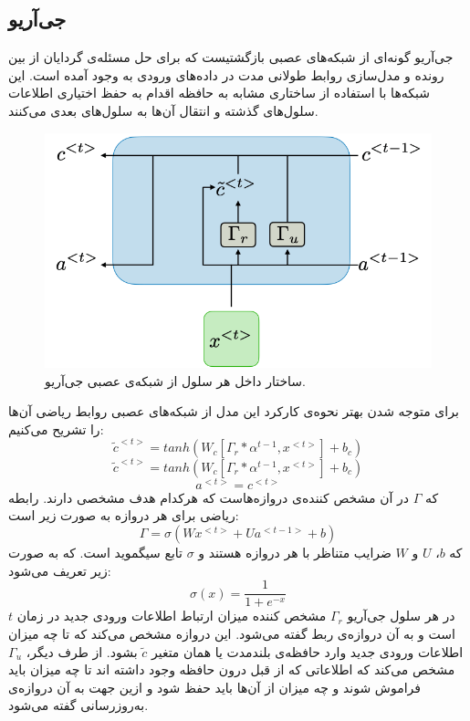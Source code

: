 \subsection{جی‌آریو}
جی‌آریو گونه‌ای از شبکه‌های عصبی بازگشتیست که برای حل مسئله‌ی گردایان از بین رونده و مدل‌سازی روابط طولانی مدت در داده‌های ورودی به وجود آمده است. این شبکه‌ها با استفاده از ساختاری مشابه به حافظه اقدام به حفظ اختیاری اطلاعات سلول‌های گذشته و انتقال آن‌ها به سلول‌های بعدی می‌کنند.\\
\begin{figure}[!t]
	\includegraphics[width=0.8 \textwidth]{images/gru_1}
	\centering
	\caption{ساختار داخل هر سلول از شبکه‌ی عصبی جی‌آریو.}
	\label{fig.gru_1}
\end{figure}
برای متوجه شدن بهتر نحوه‌ی کارکرد این مدل از شبکه‌های عصبی روابط ریاضی آن‌ها را تشریح می‌کنیم:
\begin{equation}
	\tilde{c}^{<t>} = tanh(W_c[\Gamma_r * \alpha^{t-1} , x^{<t>}] + b_c)
\end{equation}
\vspace{-4em}
\begin{equation}
	\tilde{c}^{<t>} = tanh(W_c[\Gamma_r * \alpha^{t-1} , x^{<t>}] + b_c)
\end{equation}
\vspace{-4em}
\begin{equation}
	a^{<t>} = c^{<t>}
\end{equation}
که $\Gamma$ در آن مشخص کننده‌ی دروازه‌هاست که هرکدام هدف مشخصی دارند. رابطه ریاضی برای هر دروازه به صورت زیر است:
\begin{equation}
	\Gamma = \sigma(Wx^{<t>} +Ua^{<t-1>} + b)
\end{equation}
که $b$، $U$ و $W$ ضرایب متناظر با هر دروازه هستند و $\sigma$ تابع سیگموید است. که به صورت زیر تعریف می‌شود:
\begin{equation}
	\sigma(x) = \dfrac{1}{1 + e^{-x}}
\end{equation}
در هر سلول جی‌آریو $\Gamma_r$ مشخص کننده میزان ارتباط اطلاعات ورودی جدید در زمان $t$ است و به آن‌ دروازه‌ی ربط گفته می‌شود. این دروازه مشخص می‌کند که تا چه میزان اطلاعات ورودی جدید وارد حافظه‌ی بلندمدت یا همان متغیر $\tilde{c}$ بشود. از طرف دیگر، $\Gamma_u$ مشخص می‌کند که اطلاعاتی که از قبل درون حافظه وجود داشته اند تا چه میزان باید فراموش شوند و چه میزان از آن‌ها باید حفظ شود و ازین جهت به آن دروازه‌ی به‌روزرسانی گفته می‌شود.
